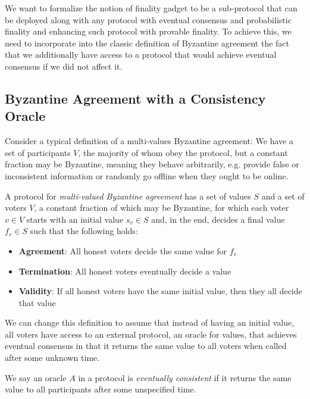 \documentclass[a4paper,UKenglish,cleveref, autoref, thm-restate, anonymous]{lipics-v2019}
\begin{document}
We want to formalize the notion of finality gadget to be a sub-protocol that can be deployed along with any protocol with
eventual consensus and probabilistic finality and enhancing such protocol with provable finality.
To achieve this, we need to incorporate into the classic definition of Byzantine agreement 
the fact that we additionally have access to a protocol that would achieve eventual consensus if we did not affect it.

\subsection{Byzantine Agreement with a Consistency Oracle}
Consider a typical definition of a multi-values Byzantine agreement: 
We have a set of participants $V$, the majority of whom obey the protocol, but a constant fraction may be Byzantine, meaning they behave arbitrarily, e.g. provide false or inconsistent information or randomly go offline when they ought to be online.

\begin{definition} A protocol for {\em multi-valued Byzantine agreement} has a set of values $S$ and a set of voters $V$, a constant fraction of which may be Byzantine, for which each voter $v \in V$ starts with an initial value $s_v \in S$ and, in the end, decides a final value $f_v \in S$ such that the following holds:

\begin{itemize}
\item {\bf Agreement}: All honest voters decide the same value for $f_v$
\item {\bf Termination}: All honest voters eventually decide a value
\item {\bf Validity}: If all honest voters have the same initial value, then they all decide that value
\end{itemize}

\end{definition}

We can change this definition to assume that instead of having an initial value, all voters have access to an external protocol, an oracle for values, that achieves eventual consensus in that it returns the same value to all voters when called after some unknown time.

\begin{definition}
We say an oracle $A$ in a protocol is {\em eventually consistent} if it returns the same value to all participants after some unspecified time.
\end{definition}
\end{document}
